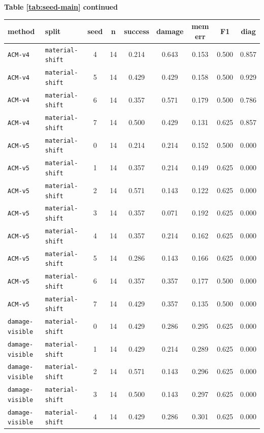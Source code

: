 \documentclass{article}
\begin{document}
\begin{center}
\textbf{Table \ref{tab:seed-main} continued}\\[0.4ex]
\begin{tabular}{llccccccc}
\toprule
method & split & seed & n & success & damage & mem err & F1 & diag \\
\midrule
\texttt{ACM-v4} & \texttt{material-shift} & 4 & 14 & 0.214 & 0.643 & 0.153 & 0.500 & 0.857 \\
\texttt{ACM-v4} & \texttt{material-shift} & 5 & 14 & 0.429 & 0.429 & 0.158 & 0.500 & 0.929 \\
\texttt{ACM-v4} & \texttt{material-shift} & 6 & 14 & 0.357 & 0.571 & 0.179 & 0.500 & 0.786 \\
\texttt{ACM-v4} & \texttt{material-shift} & 7 & 14 & 0.500 & 0.429 & 0.131 & 0.625 & 0.857 \\
\texttt{ACM-v5} & \texttt{material-shift} & 0 & 14 & 0.214 & 0.214 & 0.152 & 0.500 & 0.000 \\
\texttt{ACM-v5} & \texttt{material-shift} & 1 & 14 & 0.357 & 0.214 & 0.149 & 0.625 & 0.000 \\
\texttt{ACM-v5} & \texttt{material-shift} & 2 & 14 & 0.571 & 0.143 & 0.122 & 0.625 & 0.000 \\
\texttt{ACM-v5} & \texttt{material-shift} & 3 & 14 & 0.357 & 0.071 & 0.192 & 0.625 & 0.000 \\
\texttt{ACM-v5} & \texttt{material-shift} & 4 & 14 & 0.357 & 0.214 & 0.162 & 0.625 & 0.000 \\
\texttt{ACM-v5} & \texttt{material-shift} & 5 & 14 & 0.286 & 0.143 & 0.166 & 0.625 & 0.000 \\
\texttt{ACM-v5} & \texttt{material-shift} & 6 & 14 & 0.357 & 0.357 & 0.177 & 0.500 & 0.000 \\
\texttt{ACM-v5} & \texttt{material-shift} & 7 & 14 & 0.429 & 0.357 & 0.135 & 0.500 & 0.000 \\
\texttt{damage-visible} & \texttt{material-shift} & 0 & 14 & 0.429 & 0.286 & 0.295 & 0.625 & 0.000 \\
\texttt{damage-visible} & \texttt{material-shift} & 1 & 14 & 0.429 & 0.214 & 0.289 & 0.625 & 0.000 \\
\texttt{damage-visible} & \texttt{material-shift} & 2 & 14 & 0.571 & 0.143 & 0.296 & 0.625 & 0.000 \\
\texttt{damage-visible} & \texttt{material-shift} & 3 & 14 & 0.500 & 0.143 & 0.297 & 0.625 & 0.000 \\
\texttt{damage-visible} & \texttt{material-shift} & 4 & 14 & 0.429 & 0.286 & 0.301 & 0.625 & 0.000 \\

\end{tabular}
\end{center}
\end{document}
